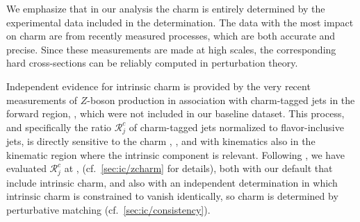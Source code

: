 We emphasize that in our analysis the charm \pdf is entirely determined by the
experimental data included in the \pdf determination. The data with the most
impact on charm are from recently measured \lhc processes, which are both
accurate and precise.
%
Since these measurements are made at high scales, the corresponding hard
cross-sections can be reliably computed in \qcd perturbation theory.

Independent evidence for intrinsic charm is provided by the very recent \lhcb
measurements of $Z$-boson production in association with charm-tagged jets in
the forward region, \cite{LHCb:2021stx}, which were not included in our
baseline dataset.
%
This process, and specifically the ratio $\mathcal{R}_j^c$ of charm-tagged jets
normalized to flavor-inclusive jets, is directly sensitive to the charm \pdf,
\cite{Boettcher:2015sqn}, and with \lhcb kinematics also in the kinematic
region  where the  intrinsic component is relevant.
%
Following \cite{Boettcher:2015sqn,LHCb:2021stx}, we have  evaluated
$\mathcal{R}_j^c$ at \nlo, \cite{Alioli:2010xd,Sjostrand:2007gs} (cf.\
\cref{sec:ic/zcharm} for details), both with our default \pdfs that include
intrinsic charm, and also with an independent \pdf determination in which
intrinsic charm is constrained to vanish  identically, so charm is determined
by perturbative matching (cf.\ \cref{sec:ic/consistency}).

